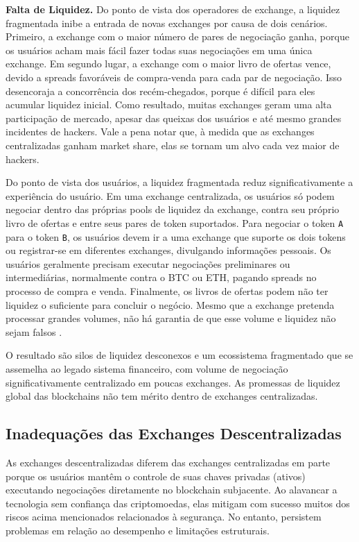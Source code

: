 \documentclass[UTF8,nofonts]{article}
\begin{document}
\begin{multicols}{2}
\textbf{Falta de Liquidez.} Do ponto de vista dos operadores de exchange, a liquidez fragmentada inibe a entrada de novas exchanges por causa de dois cenários. Primeiro, a exchange com o maior número de pares de negociação ganha, porque os usuários acham mais fácil fazer todas suas negociações em uma única exchange. Em segundo lugar, a exchange com o maior livro de ofertas vence, devido a spreads favoráveis de compra-venda para cada par de negociação. Isso desencoraja a concorrência dos recém-chegados, porque é difícil para eles acumular liquidez inicial. Como resultado, muitas exchanges geram uma alta participação de mercado, apesar das queixas dos usuários e até mesmo grandes incidentes de hackers. Vale a pena notar que, à medida que as exchanges centralizadas ganham market share, elas se tornam um alvo cada vez maior de hackers.

Do ponto de vista dos usuários, a liquidez fragmentada reduz significativamente a experiência do usuário. Em uma exchange centralizada, os usuários só podem negociar dentro das próprias pools de liquidez da exchange, contra seu próprio livro de ofertas e entre seus pares de token suportados. Para negociar o token \verb|A| para o token \verb|B|, os usuários devem ir a uma exchange que suporte os dois tokens ou registrar-se em diferentes exchanges, divulgando informações pessoais. Os usuários geralmente precisam executar negociações preliminares ou intermediárias, normalmente contra o BTC ou ETH, pagando spreads no processo de compra e venda. Finalmente, os livros de ofertas podem não ter liquidez o suficiente para concluir o negócio. Mesmo que a exchange pretenda processar grandes volumes, não há garantia de que esse volume e liquidez não sejam falsos \cite{fakevolume}.

O resultado são silos de liquidez desconexos e um ecossistema fragmentado que se assemelha ao legado sistema financeiro, com volume de negociação significativamente centralizado em poucas exchanges. As promessas de liquidez global das blockchains não tem mérito dentro de exchanges centralizadas.

\subsection{Inadequações das Exchanges Descentralizadas}
As exchanges descentralizadas diferem das exchanges centralizadas em parte porque os usuários mantêm o controle de suas chaves privadas (ativos) executando negociações diretamente no blockchain subjacente. Ao alavancar a tecnologia sem confiança das criptomoedas, elas mitigam com sucesso muitos dos riscos acima mencionados relacionados à segurança. No entanto, persistem problemas em relação ao desempenho e limitações estruturais. 


\end{multicols}
\end{document}
